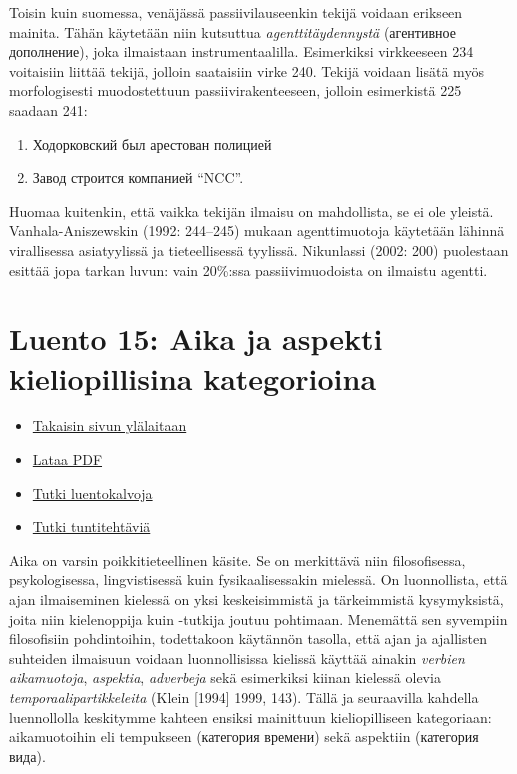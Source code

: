 \documentclass[]{scrartcl}
\providecommand{\tightlist}{%
  \setlength{\itemsep}{0pt}\setlength{\parskip}{0pt}}
\begin{document}
Toisin kuin suomessa, venäjässä passiivilauseenkin tekijä voidaan
erikseen mainita. Tähän käytetään niin kutsuttua
\emph{agenttitäydennystä} (агентивное дополнение), joka ilmaistaan
instrumentaalilla. Esimerkiksi virkkeeseen 234 voitaisiin liittää
tekijä, jolloin saataisiin virke 240. Tekijä voidaan lisätä myös
morfologisesti muodostettuun passiivirakenteeseen, jolloin esimerkistä
225 saadaan 241:

\begin{enumerate}
\def\labelenumi{(\arabic{enumi})}
\setcounter{enumi}{239}
\tightlist
\item
  Ходорковский был арестован полицией
\item
  Завод строится компанией ``NCC''.
\end{enumerate}

Huomaa kuitenkin, että vaikka tekijän ilmaisu on mahdollista, se ei ole
yleistä. Vanhala-Aniszewskin (1992: 244--245) mukaan agenttimuotoja
käytetään lähinnä virallisessa asiatyylissä ja tieteellisessä tyylissä.
Nikunlassi (2002: 200) puolestaan esittää jopa tarkan luvun: vain
20\%:ssa passiivimuodoista on ilmaistu agentti.

\section{Luento 15: Aika ja aspekti kieliopillisina
kategorioina}\label{luento-15-aika-ja-aspekti-kieliopillisina-kategorioina}

\begin{itemize}
\tightlist
\item
  \href{https://mustikka.uta.fi/~juho_harme/morfologia/\#tästä-kurssista}{Takaisin
  sivun ylälaitaan}
\item
  \href{http://mustikka.uta.fi/~juho_harme/morfologia/materiaalit/luento15.pdf}{Lataa
  PDF}
\item
  \href{http://mustikka.uta.fi/~juho_harme/morfologia/presentations/luento15.html}{Tutki
  luentokalvoja}
\item
  \href{http://mustikka.uta.fi/~juho_harme/morfologia/tehtavat/luento15.pdf}{Tutki
  tuntitehtäviä}
\end{itemize}

Aika on varsin poikkitieteellinen käsite. Se on merkittävä niin
filosofisessa, psykologisessa, lingvistisessä kuin fysikaalisessakin
mielessä. On luonnollista, että ajan ilmaiseminen kielessä on yksi
keskeisimmistä ja tärkeimmistä kysymyksistä, joita niin kielenoppija
kuin -tutkija joutuu pohtimaan. Menemättä sen syvempiin filosofisiin
pohdintoihin, todettakoon käytännön tasolla, että ajan ja ajallisten
suhteiden ilmaisuun voidaan luonnollisissa kielissä käyttää ainakin
\emph{verbien aikamuotoja}, \emph{aspektia}, \emph{adverbeja} sekä
esimerkiksi kiinan kielessä olevia \emph{temporaalipartikkeleita} (Klein
{[}1994{]} 1999, 143). Tällä ja seuraavilla kahdella luennollolla
keskitymme kahteen ensiksi mainittuun kieliopilliseen kategoriaan:
aikamuotoihin eli tempukseen (категория времени) sekä aspektiin
(категория вида).
\end{document}
